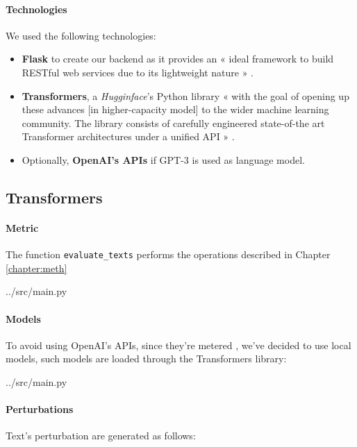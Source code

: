 \paragraph{Technologies}
We used the following technologies:

\begin{itemize}
	\item \textbf{Flask} to create our backend as it provides an « ideal framework to build RESTful web services due to its lightweight nature » \cite{grinberg2018flask}.
	
	\item \textbf{Transformers}, a \textit{Hugginface}'s Python library « with the
	goal of opening up these advances [in higher-capacity model] to the
	wider machine learning community. The library consists of carefully engineered state-of-the art Transformer architectures under a
	unified API » \cite{wolf2020huggingfaces}.
	
	\item Optionally, \textbf{OpenAI's APIs} if GPT-3 is used as language model.
\end{itemize}

\subsection{Transformers}

\paragraph{Metric}
The function \texttt{evaluate\_texts} performs the operations described in Chapter \ref{chapter:meth}


{../src/main.py}

\paragraph{Models}
To avoid using OpenAI's APIs, since they're metered \cite{openaiprice}, we've decided to use local models, such models are loaded through the Transformers library:


{../src/main.py}

\paragraph{Perturbations}
Text's perturbation are generated as follows:

